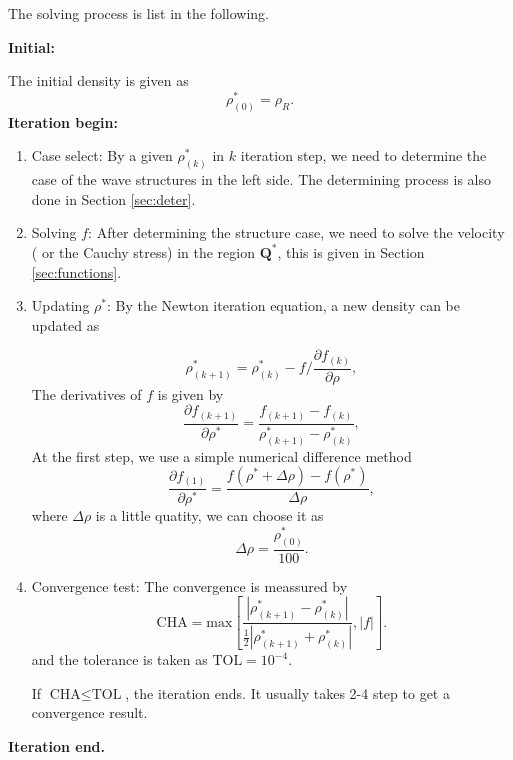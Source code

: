 \documentclass{article}
\numberwithin{equation}{section}
\numberwithin{table}{section}
\begin{document}
The solving process is list in the following.

\noindent  \textbf{Initial:}

	The initial density is  given as
\begin{equation}
\rho_{(0)}^* = \rho_R.
\end{equation}
\textbf{Iteration begin:}
\begin{enumerate}[Step 1]
  \item Case select:
	By a given  $\rho _{(k)}^*$ in $k$ iteration step, we need to determine the case of the wave structures in the left side. The determining  process is  also done in Section \ref{sec:deter}.

  \item Solving $f$:  After determining the structure case, we need to solve the velocity ( or  the Cauchy stress) in  the region $\mathbf{Q}^*$, this is  given in Section \ref{sec:functions}.

  \item  Updating   $\rho^*$:   By the Newton iteration equation, a new density can be updated as

\begin{equation}
 \rho^*_{(k+1)} = \rho^*_{(k)}- f/\frac{\partial f_{(k)}}{\partial \rho},
\end{equation}
The derivatives of $f$ is  given by
\begin{equation}
  \frac{\partial f_{(k+1)}}{\partial \rho^*} = \frac{f_{(k+1)}-f_{(k)}}{\rho_{(k+1)}^* - \rho^*_{(k)}},
\end{equation}
At the first step, we use a simple  numerical difference  method
\begin{equation}
  \frac{\partial f_{(1)}}{\partial \rho^*} = \frac{f(\rho^*+\Delta \rho)-f(\rho^*)}{\Delta \rho},
\end{equation}
where $\Delta \rho$ is a little quatity, we can choose it as
\begin{equation}
  \Delta \rho = \frac{\rho_{(0)}^*}{100}.
\end{equation}
\item Convergence test:
The  convergence is meassured by
\begin{equation}
\text{CHA} = \text{max} \left[
\frac{|\rho_{(k+1)}^*- \rho_{(k)}^*|}{\frac{1}{2}|\rho_{(k+1)}^*+\rho_{(k)}^*|},|f|\right].
\end{equation}
and the tolerance is taken as $\text{TOL} = 10^{-4}$.

If $ \text{CHA} \le \text{TOL} $, the iteration ends.
It usually takes 2-4 step to get a convergence result.
\end{enumerate}
\textbf{Iteration end.}
\end{document}
